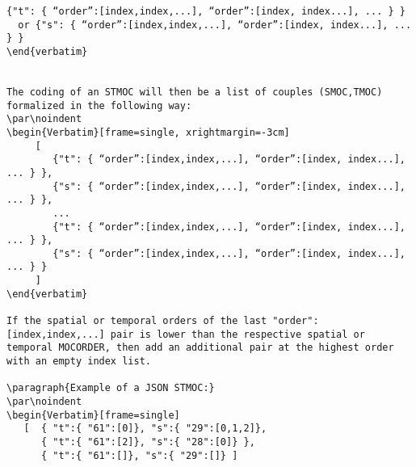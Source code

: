 \par\noindent
\begin{Verbatim}[frame=single, xrightmargin=-3cm] 
     {"t": { “order”:[index,index,...], “order”:[index, index...], ... } }
  or {"s": { “order”:[index,index,...], “order”:[index, index...], ... } }
\end{verbatim}


The coding of an STMOC will then be a list of couples (SMOC,TMOC) formalized in the following way:
\par\noindent
\begin{Verbatim}[frame=single, xrightmargin=-3cm] 
     [
        {"t": { “order”:[index,index,...], “order”:[index, index...], ... } },
        {"s": { “order”:[index,index,...], “order”:[index, index...], ... } },
        ...
        {"t": { “order”:[index,index,...], “order”:[index, index...], ... } },
        {"s": { “order”:[index,index,...], “order”:[index, index...], ... } }
     ]
\end{verbatim}

If the spatial or temporal orders of the last "order":[index,index,...] pair is lower than the respective spatial or temporal MOCORDER, then add an additional pair at the highest order with an empty index list.

\paragraph{Example of a JSON STMOC:}
\par\noindent
\begin{Verbatim}[frame=single]
   [  { "t":{ "61":[0]}, "s":{ "29":[0,1,2]},
      { "t":{ "61":[2]}, "s":{ "28":[0]} },
      { "t":{ "61":[]}, "s":{ "29":[]} ]
\end{Verbatim}

